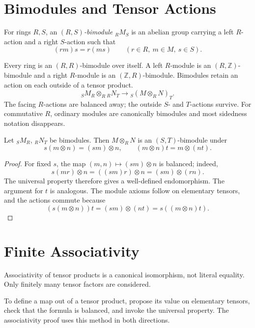 \section{Bimodules and Tensor Actions}\label{sec:bimodules-tensors}
\begin{definition}
For rings \(R,S\), an \emph{\((R,S)\)-bimodule} \({}_RM_S\) is an abelian
group carrying a left \(R\)-action and a right \(S\)-action such that
\[
(rm)s=r(ms)
\qquad(r\in R,\ m\in M,\ s\in S).
\]
\end{definition}

Every ring is an \((R,R)\)-bimodule over itself. A left \(R\)-module is an
\((R,\mathbb Z)\)-bimodule and a right \(R\)-module is an
\((\mathbb Z,R)\)-bimodule. Bimodules retain an action on each outside of a
tensor product.
\[
{}_SM_R\otimes_R{}_RN_T\longrightarrow{}_S(M\otimes_RN)_T.
\]
The facing \(R\)-actions are balanced away; the outside \(S\)- and
\(T\)-actions survive. For commutative \(R\), ordinary modules are
canonically bimodules and most sidedness notation disappears.

\begin{proposition}\label{prop:tensor-actions}
Let \({}_SM_R\), \({}_RN_T\) be bimodules. Then \(M\otimes_RN\) is an
\((S,T)\)-bimodule under
\[
s(m\otimes n)=(sm)\otimes n,
\qquad
(m\otimes n)t=m\otimes(nt).
\]
\end{proposition}
\begin{proof}
For fixed \(s\), the map \((m,n)\mapsto(sm)\otimes n\) is balanced; indeed,
\[
s(mr)\otimes n=((sm)r)\otimes n=(sm)\otimes(rn).
\]
The universal property therefore gives a well-defined endomorphism. The
argument for \(t\) is analogous. The module axioms follow on elementary tensors,
and the actions commute because
\[
(s(m\otimes n))t=(sm)\otimes(nt)=s((m\otimes n)t).
\]
\end{proof}

\section{Finite Associativity}\label{sec:tensor-associativity}
Associativity of tensor products is a canonical isomorphism, not literal
equality. Only finitely many tensor factors are considered.

\begin{remark}
To define a map out of a tensor product, propose its value on elementary tensors,
check that the formula is balanced, and invoke the universal property. The
associativity proof uses this method in both directions.
\end{remark}

